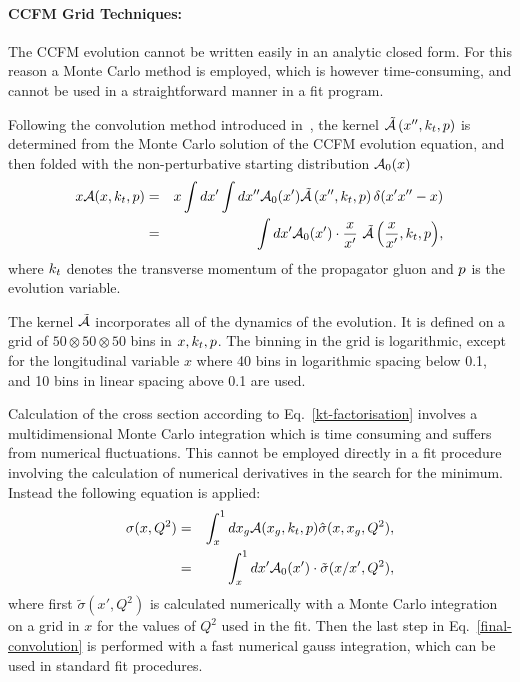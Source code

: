 \paragraph{CCFM Grid Techniques:} \rm

The CCFM evolution cannot be written easily in an analytic closed form. For this 
reason a Monte Carlo method is employed, which is however time-consuming, and 
cannot be used in a straightforward manner in a fit program. 

Following the  convolution method introduced in~\cite{Jung:2012hy,Hautmann:2013tba}, the 
kernel $ \tilde {\cal A}\left(x'',\kt,\Pmax\right) $ is determined from the Monte Carlo  solution of the CCFM evolution equation, 
and then folded with the non-perturbative starting distribution ${\cal A}_0 (x)$
{ 
\begin{eqnarray}
x {\cal A}(x,\kt,\Pmax) &= &x\int dx' \int dx'' {\cal A}_0 (x') \tilde{\cal A}\left(x'',\kt,\Pmax\right) 
 \delta(x' 
x'' - x) 
\nonumber  
\\
& = & \int dx' {{\cal A}_0 (x') }  
\cdot \frac{x}{x'} \ { \tilde{\cal A}\left(\frac{x}{x'},\kt,\Pmax\right) }, 
\end{eqnarray}
}
where $k_t$ denotes the transverse momentum of the propagator gluon and $p$ is the 
evolution variable.

The kernel $\tilde{\cal A}$ incorporates all of  the dynamics of the evolution.  
It is defined on a grid of $50\otimes50\otimes50$ bins in $ x, k_t, p$.  
The binning in the grid is logarithmic, except for the longitudinal variable 
$x$ where 40 bins in logarithmic 
spacing below 0.1, and 10 bins in linear spacing above 0.1 are used.

Calculation of the cross section according to Eq.~\ref{kt-factorisation} involves a 
multidimensional Monte Carlo integration which is time consuming and suffers from numerical fluctuations.  
This cannot be employed directly in a fit procedure involving the calculation of numerical derivatives 
in the search for the minimum. Instead the following equation is applied:
\begin{eqnarray}
\sigma(x,Q^2) & = & \int_x^1 d x_g {\cal A}(x_g,\kt,\Pmax) \hat{ \sigma}(x,x_g,Q^2), 
\nonumber\\
  & = & \int_x^1 dx' {\cal A}_0 (x') \cdot \tilde{ \sigma}(x/x',Q^2),
    \label{final-convolution}
 \end{eqnarray}
where first $ \tilde{ \sigma}(x',Q^2)$ is calculated numerically with a Monte Carlo integration 
on a grid in $x$ for the values of $Q^2$ used in the fit. Then the last step in Eq.~\ref{final-convolution}  
is performed with a fast numerical gauss integration, which can be used in standard fit procedures.

